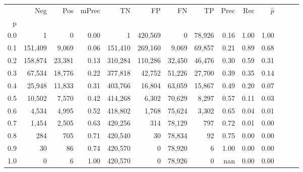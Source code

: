 \begin{tabular}{rrrrrrrrrrrrrr}
\toprule
{} &      Neg &     Pos & mPrec &       TN &       FP &      FN &      TP &  Prec &   Rec & $\hat{p}$ \\
p   &          &         &       &          &          &         &         &       &       &           \\
\midrule
0.0 &        1 &       0 &  0.00 &        1 &  420,569 &       0 &  78,926 &  0.16 &  1.00 &      1.00 \\
0.1 &  151,409 &   9,069 &  0.06 &  151,410 &  269,160 &   9,069 &  69,857 &  0.21 &  0.89 &      0.68 \\
0.2 &  158,874 &  23,381 &  0.13 &  310,284 &  110,286 &  32,450 &  46,476 &  0.30 &  0.59 &      0.31 \\
0.3 &   67,534 &  18,776 &  0.22 &  377,818 &   42,752 &  51,226 &  27,700 &  0.39 &  0.35 &      0.14 \\
0.4 &   25,948 &  11,833 &  0.31 &  403,766 &   16,804 &  63,059 &  15,867 &  0.49 &  0.20 &      0.07 \\
0.5 &   10,502 &   7,570 &  0.42 &  414,268 &    6,302 &  70,629 &   8,297 &  0.57 &  0.11 &      0.03 \\
0.6 &    4,534 &   4,995 &  0.52 &  418,802 &    1,768 &  75,624 &   3,302 &  0.65 &  0.04 &      0.01 \\
0.7 &    1,454 &   2,505 &  0.63 &  420,256 &      314 &  78,129 &     797 &  0.72 &  0.01 &      0.00 \\
0.8 &      284 &     705 &  0.71 &  420,540 &       30 &  78,834 &      92 &  0.75 &  0.00 &      0.00 \\
0.9 &       30 &      86 &  0.74 &  420,570 &        0 &  78,920 &       6 &  1.00 &  0.00 &      0.00 \\
1.0 &        0 &       6 &  1.00 &  420,570 &        0 &  78,926 &       0 &   nan &  0.00 &      0.00 \\
\bottomrule
\end{tabular}

